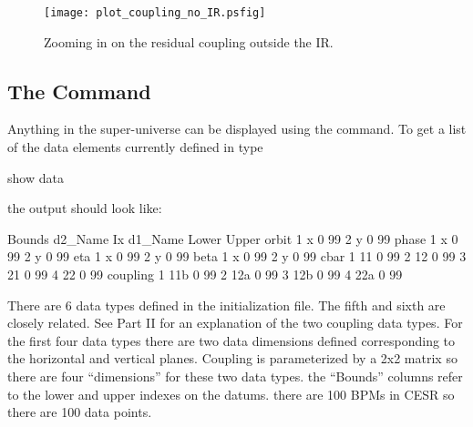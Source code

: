 \begin{figure}
  \centering
  \texttt{[image: plot\_coupling\_no\_IR.psfig]}
  \caption{Zooming in on the residual coupling outside the IR.}
  \label{f:plot_coupling_no_IR}
\end{figure}

\subsection{The  Command}

Anything in the super-universe can be displayed using the 
command. To get a list of the data elements currently defined in \tao
type
\begin{example}
  show data
\end{example}
the output should look like:
\begin{example}
                                                              Bounds
     d2\_Name                       Ix  d1\_Name              Lower  Upper
     orbit
                                    1  x                      0    99
                                    2  y                      0    99
     phase
                                    1  x                      0    99
                                    2  y                      0    99
     eta
                                    1  x                      0    99
                                    2  y                      0    99
     beta
                                    1  x                      0    99
                                    2  y                      0    99
     cbar
                                    1  11                     0    99
                                    2  12                     0    99
                                    3  21                     0    99
                                    4  22                     0    99
     coupling
                                    1  11b                    0    99
                                    2  12a                    0    99
                                    3  12b                    0    99
                                    4  22a                    0    99

\end{example}
There are 6 data types defined in the initialization file. The fifth
and sixth are closely related. See Part II for an explanation of the
two coupling data types.  For the first four data types there are two
data dimensions defined corresponding to the horizontal and vertical
planes. Coupling is parameterized by a 2x2 matrix so there are four
``dimensions'' for these two data types. the ``Bounds'' columns refer
to the lower and upper indexes on the datums. there are 100 BPMs in
CESR so there are 100 data points.

